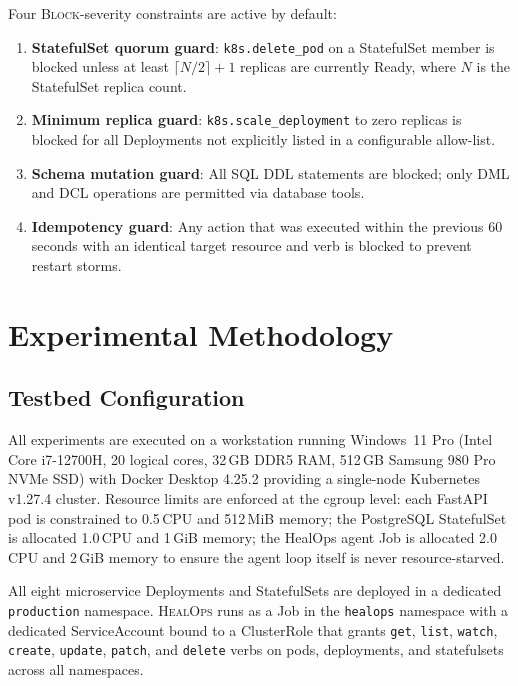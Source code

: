 \documentclass[journal,10pt,twoside]{IEEEtran}
\newcommand{\HealOps}{\textsc{HealOps}}
\begin{document}
Four \textsc{Block}-severity constraints are active by default:

\begin{enumerate}
  \item \textbf{StatefulSet quorum guard}: \texttt{k8s.delete\_pod} on a
        StatefulSet member is blocked unless at least $\lceil N/2 \rceil + 1$
        replicas are currently Ready, where $N$ is the StatefulSet replica count.
  \item \textbf{Minimum replica guard}: \texttt{k8s.scale\_deployment}
        to zero replicas is blocked for all Deployments not explicitly
        listed in a configurable allow-list.
  \item \textbf{Schema mutation guard}: All SQL DDL statements are blocked;
        only DML and DCL operations are permitted via database tools.
  \item \textbf{Idempotency guard}: Any action that was executed within
        the previous 60 seconds with an identical target resource and
        verb is blocked to prevent restart storms.
\end{enumerate}

\section{Experimental Methodology}\label{sec:eval}

\subsection{Testbed Configuration}

All experiments are executed on a workstation running Windows~11 Pro
(Intel Core i7-12700H, 20 logical cores, 32\,GB DDR5 RAM, 512\,GB
Samsung 980 Pro NVMe SSD) with Docker Desktop 4.25.2 providing a
single-node Kubernetes v1.27.4 cluster. Resource limits are enforced
at the cgroup level: each FastAPI pod is constrained to 0.5\,CPU and
512\,MiB memory; the PostgreSQL StatefulSet is allocated 1.0\,CPU and
1\,GiB memory; the HealOps agent Job is allocated 2.0\,CPU and
2\,GiB memory to ensure the agent loop itself is never resource-starved.

All eight microservice Deployments and StatefulSets are deployed in a
dedicated \texttt{production} namespace. \HealOps{} runs as a Job in
the \texttt{healops} namespace with a dedicated ServiceAccount bound to
a ClusterRole that grants \texttt{get}, \texttt{list}, \texttt{watch},
\texttt{create}, \texttt{update}, \texttt{patch}, and \texttt{delete}
verbs on pods, deployments, and statefulsets across all namespaces.
\end{document}
